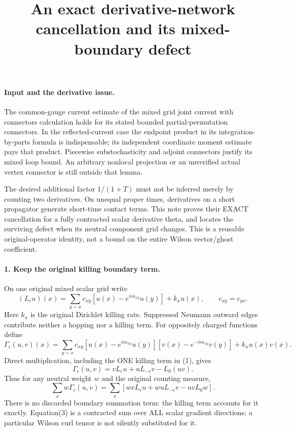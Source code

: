 \documentclass[11pt]{article}
\title{An exact derivative-network cancellation and its mixed-boundary defect}\author{}\date{}
\begin{document}
\maketitle
\paragraph{Input and the derivative issue.}
The common-gauge current estimate of the mixed grid joint current with connectors calculation holds for its stated bounded
partial-permutation connectors. In the reflected-current case the
endpoint product in its integration-by-parts formula is indispensable;
its independent coordinate moment estimate pays that product. Piecewise
substochasticity and adjoint connectors justify its mixed loop bound.
An arbitrary nonlocal projection or an unverified actual vertex connector
is still outside that lemma.

The desired additional factor $1/(1+T)$ must not be inferred merely by
counting two derivatives. On unequal proper times, derivatives on a short
propagator generate short-time contact terms. This note proves their
EXACT cancellation for a fully contracted scalar derivative theta, and
locates the surviving defect when its neutral component grid changes.
This is a reusable original-operator identity, not a bound on the entire
Wilson vector/ghost coefficient.

\paragraph{1. Keep the original killing boundary term.}
On one original mixed scalar grid write
\[
 (L_\epsilon u)(x)=\sum_{y\sim x}c_{xy}
 [u(x)-e^{i\epsilon a_{xy}}u(y)]+k_xu(x),\qquad c_{xy}=c_{yx}.
\]
Here $k_x$ is the original Dirichlet killing rate. Suppressed Neumann
outward edges contribute neither a hopping nor a killing term.
For oppositely charged functions define
\[
 \Gamma_\epsilon(u,v)(x)=\sum_{y\sim x}c_{xy}
 [u(x)-e^{i\epsilon a_{xy}}u(y)]
 [v(x)-e^{-i\epsilon a_{xy}}v(y)]+k_xu(x)v(x).                    \tag{1}
\]
Direct multiplication, including the ONE killing term in (1), gives
\[
 \Gamma_\epsilon(u,v)=vL_\epsilon u+uL_{-\epsilon}v-L_0(uv).
                                                                    \tag{2}
\]
Thus for any neutral weight $w$ and the original counting measure,
\[
 \sum_x w\Gamma_\epsilon(u,v)=
 \sum_x[w v L_\epsilon u+w u L_{-\epsilon}v-uvL_0w].              \tag{3}
\]
There is no discarded boundary summation term: the killing term accounts
for it exactly. Equation(3) is a contracted sum over ALL scalar gradient
directions; a particular Wilson curl tensor is not silently substituted
for it.
\end{document}
